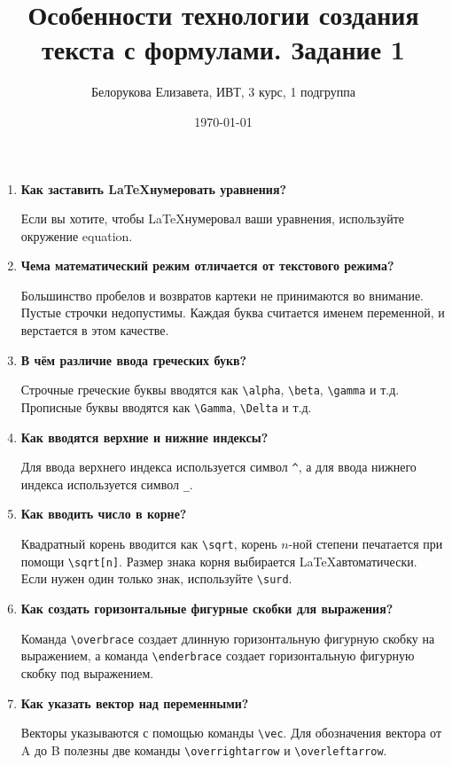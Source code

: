 \documentclass[a4paper,12pt]{article} %
\author{Белорукова Елизавета, ИВТ, 3 курс, 1 подгруппа}
\title{Особенности технологии создания текста с формулами. Задание 1}
\date{\today}
\begin{document}
\maketitle
\newpage

\begin{enumerate}

\item \large \textbf{Как заставить \LaTeX нумеровать уравнения?}

\normalsize Если вы хотите, чтобы \LaTeX нумеровал ваши уравнения, используйте окружение equation.

\item \large \textbf{Чема математический режим отличается от текстового режима?}

\normalsize Большинство пробелов и возвратов картеки не принимаются во внимание. Пустые строчки недопустимы. Каждая буква считается именем переменной, и верстается в этом качестве.

\item \large \textbf{В чём различие ввода греческих букв?}

\normalsize Строчные греческие буквы вводятся как \verb|\alpha|, \verb|\beta|, \verb|\gamma| и т.д. Прописные буквы вводятся как \verb|\Gamma|, \verb|\Delta| и т.д.

\item \large \textbf{Как вводятся верхние и нижние индексы?}

\normalsize Для ввода верхнего индекса используется символ \verb|^|, а для ввода нижнего индекса используется символ \verb|_|.

\item \large \textbf{Как вводить число в корне?}

\normalsize Квадратный корень вводится как \verb|\sqrt|, корень $n$-ной степени печатается при помощи \verb|\sqrt[n]|. Размер знака корня выбирается \LaTeX автоматически. Если нужен один только знак, используйте \verb|\surd|.

\item \large \textbf{Как создать горизонтальные фигурные скобки для выражения?}

\normalsize Команда \verb|\overbrace| создает длинную горизонтальную фигурную скобку на выражением, а команда \verb|\enderbrace| создает горизонтальную фигурную скобку под выражением.

\item \large \textbf{Как указать вектор над переменными?}

\normalsize Векторы указываются с помощью команды \verb|\vec|. Для обозначения вектора от A до B полезны две команды \verb|\overrightarrow| и \verb|\overleftarrow|.


\end{enumerate}
\end{document}
